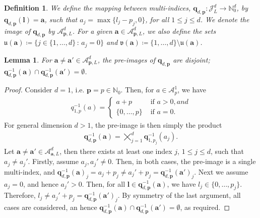 \documentclass[pdflatex,sn-mathphys-num]{sn-jnl}%
\theoremstyle{thmstyleone}%
\newtheorem{lemma}{Lemma}%
\theoremstyle{thmstyletwo}%
\theoremstyle{thmstylethree}%
\newtheorem{definition}{Definition}%
\begin{document}
\begin{definition}\label{def: q}
    We define the mapping between multi-indices, \(\mathbf{q}_{d,\mathbf{p}}:\mathcal{J}_L^d\rightarrow\mathbb{N}_0^d\), by \(\mathbf{q}_{d,\mathbf{p}}(\boldsymbol{l})=\mathbf{a}\), such that \(a_j=\max\{l_j-p_j,0\}\), for all \(1\leq j\leq d\). We denote the image of \(\mathbf{q}_{d,\mathbf{p}}\) by \(\mathcal{A}_{\mathbf{p},L}^d\). For a given \(\mathbf{a}\in\mathcal{A}_{\mathbf{p},L}^d\), we also define the sets \(\mathfrak{u}(\mathbf{a})\coloneqq\{j\in\{1,\dots,d\}\,:\,a_j=0\}\) and \(\mathfrak{v}(\mathbf{a})\coloneqq\{1,\dots,d\}\setminus\mathfrak{u}(\mathbf{a})\).
\end{definition}
\begin{lemma}\label{lem: disjoint preimages}
    For \(\mathbf{a}\neq\mathbf{a'}\in\mathcal{A}_{\mathbf{p},L}^d\), the pre-images of \(\mathbf{q}_{d,\mathbf{p}}\) are disjoint; \(\mathbf{q}_{d,\mathbf{p}}^{-1}(\mathbf{a})\cap\mathbf{q}^{-1}_{d,\mathbf{p}}(\mathbf{a}')=\emptyset\).
\end{lemma}
\begin{proof}
    Consider \(d=1\), i.e. \(\mathbf{p}=p\in\mathbb{N}_0\). Then, for \(a\in\mathcal{A}^1_p\), we have
    \begin{align}
        q^{-1}_{1,p}(a)=\begin{cases}
            a+p &\textrm{ if }a>0, and\\
            \{0,\dots,p\} &\textrm{ if }a=0.
        \end{cases}\nonumber
    \end{align}
    For general dimension \(d>1\), the pre-image is then simply the product
    \begin{align}
        \mathbf{q}_{d,\mathbf{p}}^{-1}(\mathbf{a})=\bigtimes_{j=1}^d\mathbf{q}_{1,p_j}^{-1}(a_j).\nonumber
    \end{align}
    Let \(\mathbf{a}\neq\mathbf{a}'\in\mathcal{A}_{\mathbf{a},L}^d\), then there exists at least one index \(j\), \(1\leq j\leq d\), such that \(a_j\neq a_j'\). Firstly, assume \(a_j,a_j'\neq 0\). Then, in both cases, the pre-image is a single multi-index, and
    \(\mathbf{q}_{d,\mathbf{p}}^{-1}(\mathbf{a})_j = a_j +p_j\neq a_j' +p_j = \mathbf{q}_{d,\mathbf{p}}^{-1}(\mathbf{a}')_j\). Next we assume \(a_j=0\), and hence \(a_j'>0\). Then, for all \(\boldsymbol{l}\in \mathbf{q}_{d,\mathbf{p}}^{-1}(\mathbf{a})\), we have \(l_j\in\{0,\dots,p_j\}\). Therefore, \(l_j\neq a_j'+p_j=\mathbf{q}_{d,\mathbf{p}}^{-1}(\mathbf{a}')_j\). By symmetry of the last argument, all cases are considered, an hence \(\mathbf{q}_{d,\mathbf{p}}^{-1}(\mathbf{a})\cap \mathbf{q}_{d,\mathbf{p}}^{-1}(\mathbf{a}')=\emptyset\), as required.
\end{proof}
\end{document}
